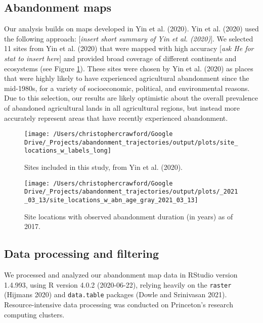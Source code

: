 \documentclass[
]{article}
\begin{document}
\hypertarget{abandonment-maps}{%
\subsection{Abandonment maps}\label{abandonment-maps}}

Our analysis builds on maps developed in Yin et al. (2020). Yin et al. (2020) used the following approach: {[}\emph{insert short summary of Yin et al. (2020)}{]}.
We selected 11 sites from Yin et al. (2020) that were mapped with high accuracy {[}\emph{ask He for stat to insert here}{]} and provided broad coverage of different continents and ecosystems (see Figure \ref{fig:site-locations}).
These sites were chosen by Yin et al. (2020) as places that were highly likely to have experienced agricultural abandonment since the mid-1980s, for a variety of socioeconomic, political, and environmental reasons.
Due to this selection, our results are likely optimistic about the overall prevalence of abandoned agricultural lands in all agricultural regions, but instead more accurately represent areas that have recently experienced abandonment.



\begin{figure}
\texttt{[image: /Users/christophercrawford/Google Drive/\_Projects/abandonment\_trajectories/output/plots/site\_locations\_w\_labels\_long]} \caption{Sites included in this study, from Yin et al. (2020).}\label{fig:site-locations}
\end{figure}



\begin{figure}
\texttt{[image: /Users/christophercrawford/Google Drive/\_Projects/abandonment\_trajectories/output/plots/\_2021\_03\_13/site\_locations\_w\_abn\_age\_gray\_2021\_03\_13]} \caption{Site locations with observed abandonment duration (in years) as of 2017.}\label{fig:site-locations-w-age}
\end{figure}

\hypertarget{data-processing-and-filtering}{%
\subsection{Data processing and filtering}\label{data-processing-and-filtering}}

We processed and analyzed our abandonment map data in RStudio version 1.4.993, using R version 4.0.2 (2020-06-22), relying heavily on the \texttt{raster} (Hijmans 2020) and \texttt{data.table} packages (Dowle and Srinivasan 2021).
Resource-intensive data processing was conducted on Princeton's research computing clusters.
\end{document}

